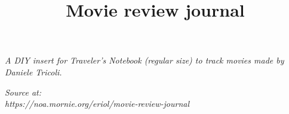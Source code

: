 \documentclass[11pt, a4paper]{article}
\title{Movie review journal}
\date{}
\begin{document}
    \vspace*{\fill}
    \emph{A DIY insert for Traveler's Notebook (regular size) to track movies
    made by Daniele Tricoli.}

    \emph{Source at: \\ https://noa.mornie.org/eriol/movie-review-journal}
    \pagebreak

    \maketitle

    \begin{figure}[h!]
        \centering
        
    \end{figure}
    \pagebreak

\end{document}
